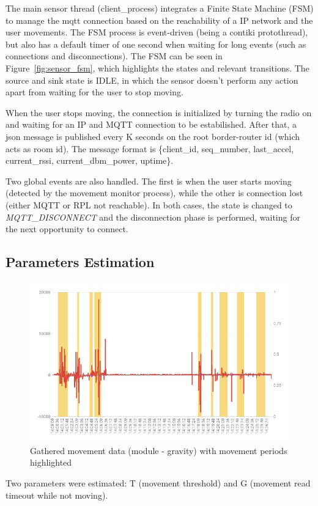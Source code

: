 \documentclass[a4paper, 10pt]{article}
\begin{document}
The main sensor thread (client\_process) integrates a Finite State Machine (FSM) to manage the mqtt connection based on the reachability of a IP network and the user movements.
The FSM process is event-driven (being a contiki protothread), but also has a default timer of one second when waiting for long events (such as connections and disconnections).
The FSM can be seen in Figure~\ref{fig:sensor_fsm}, which highlights the states and relevant transitions.
The source and sink state is IDLE, in which the sensor doesn't perform any action apart from waiting for the user to stop moving.

When the user stops moving, the connection is initialized by turning the radio on and waiting for an IP and MQTT connection to be estabilished. 
After that, a json message is published every K seconds on the root border-router id (which acts as room id).
The message format is \{client\_id, seq\_number, last\_accel, current\_rssi, current\_dbm\_power, uptime\}.

Two global events are also handled. The first is when the user starts moving (detected by the movement monitor process), while the other is connection lost (either MQTT or RPL not reachable). In both cases, the state is changed to \emph{MQTT\_DISCONNECT} and the disconnection phase is performed, waiting for the next opportunity to connect.

\subsection*{Parameters Estimation}

\begin{figure}[h]
\centering
    \includegraphics[width=0.7\linewidth]{images/accel_chart.png}
    \caption{Gathered movement data (module - gravity) with movement periods highlighted}
    \label{fig:accel_data}
\end{figure}

Two parameters were estimated: T (movement threshold) and G (movement read timeout while not moving).
\end{document}
